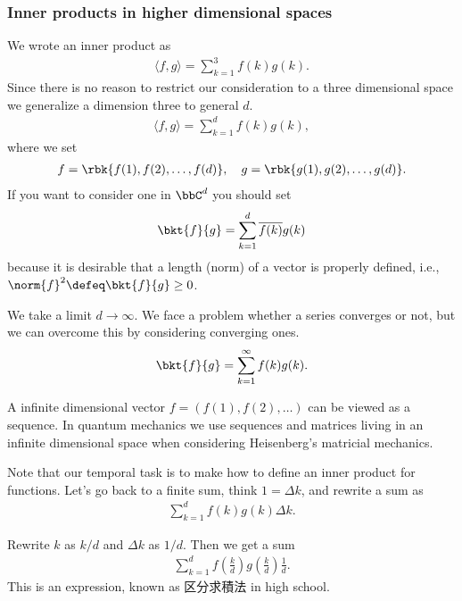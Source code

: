 \documentclass[openany, a4paper, oneside]{jsbook}
\begin{document}
\subsubsection{Inner products in higher dimensional spaces}

We wrote an inner product as
\begin{align}
 \langle f , g \rangle
 =
 \sum_{k=1}^3 f(k)g(k).
\end{align}
Since there is no reason to restrict our consideration to a three dimensional space
we generalize a dimension three to general $d$.
\begin{align}
 \langle f , g \rangle
 =
 \sum_{k=1}^d f(k)g(k),
\end{align}
where we set
\begin{align}
 f = \rbk{f(1), f(2), \dots, f(d)}, \quad
 g = \rbk{g(1), g(2), \dots, g(d)}.
\end{align}
If you want to consider one in $\bbC^d$ you should set
\begin{align}
 \bkt{f}{g}
 =
 \sum_{k=1}^d \overline{f(k)} g(k)
\end{align}
because it is desirable that a length (norm) of a vector is
properly defined, i.e., $\norm{f}^2 \defeq \bkt{f}{g} \geq 0$.

We take a limit $d \to \infty$.
We face a problem whether a series converges or not,
but we can overcome this by considering converging ones.
\begin{align}
 \bkt{f}{g}
 =
 \sum_{k=1}^{\infty} f(k)g(k).
\end{align}

\begin{rem}
 A infinite dimensional vector $f = (f(1), f(2), \dots)$
 can be viewed as a sequence.
 In quantum mechanics we use sequences and matrices living in an infinite dimensional space
 when considering Heisenberg's matricial mechanics.
\end{rem}

Note that our temporal task is to make how to define an inner product for functions.
Let's go back to a finite sum, think $1 = \Delta k$, and rewrite a sum as
\begin{align}
 \sum_{k=1}^{d} f(k)g(k) \Delta k.
\end{align}

Rewrite $k$ as $k/d$ and $\Delta k$ as $1/d$.
Then we get a sum
\begin{align}
 \sum_{k=1}^{d} f \left( \frac{k}{d} \right) g \left( \frac{k}{d} \right) \frac{1}{d}.
\end{align}
This is an expression, known as 区分求積法 in high school\footnotemark[6]{}.
\end{document}
